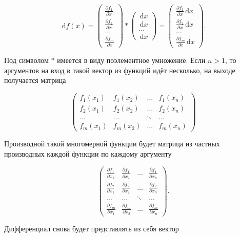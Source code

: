 \documentclass[12pt,fleqn]{article}
\newcommand{\dx}[1]{\,\mathrm{d}#1} %
\begin{document}
\begin{enumerate}
\[
\dx{f(x)} = \begin{pmatrix} \frac{\partial f_1}{\partial x} \\ \frac{\partial f_2}{\partial x} \\ \ldots  \\ \frac{\partial f_m}{\partial x} \end{pmatrix} * \begin{pmatrix} \dx{x} \\ \dx{x} \\ \ldots  \\ \dx{x} \end{pmatrix}  = \begin{pmatrix} \frac{\partial f_1}{\partial x} \dx{x} \\ \frac{\partial f_2}{\partial x} \dx{x} \\ \ldots  \\ \frac{\partial f_m}{\partial x} \dx{x} \end{pmatrix}.
\]

Под символом $*$ имеется в виду поэлементное умножение. Если $n > 1$, то аргументов на вход в такой вектор из функций идёт несколько, на выходе получается матрица 

\[
\begin{pmatrix} f_1(x_1) & f_1(x_2) & \ldots & f_1(x_n) \\ f_2(x_1)  & f_2(x_2) & \ldots & f_2(x_n)  \\ \ldots & \ldots & \ddots & \ldots  \\ f_m(x_1)  & f_m(x_2) & \ldots & f_m(x_n) \end{pmatrix}
\]
  
Производной такой многомерной функции будет матрица из частных производных каждой функции по каждому аргументу

\[
\begin{pmatrix} \frac{\partial f_1}{\partial x_1} & \frac{\partial f_1}{\partial x_2} & \ldots & \frac{\partial f_1}{\partial x_n} \\ \frac{\partial f_2}{\partial x_1}  & \frac{\partial f_2}{\partial x_2} & \ldots & \frac{\partial f_2}{\partial x_n}  \\ \ldots & \ldots & \ddots & \ldots  \\ \frac{\partial f_m}{\partial x_1}  & \frac{\partial f_m}{\partial x_2} & \ldots & \frac{\partial f_m}{\partial x_n} \end{pmatrix}.
\]

Дифференциал снова будет представлять из себя вектор


\end{enumerate}
\end{document}
